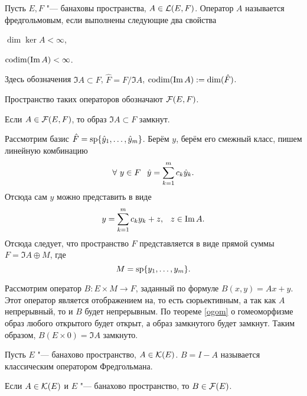 \begin{Def}
  Пусть $E,F$ "--- банаховы пространства, $A\in\L(E,F)$. Оператор $A$ называется фредгольмовым, если выполнены следующие два свойства
\begin{roItems}
\item $\dim\ker A<\infty$,
\item $\codim(\Im A)<\infty$.
\end{roItems}
Здесь обозначения $\Im A\subset F$, $\hat F = F/\Im A$, $\codim (\Im A):=\dim(\hat F)$.

Пространство таких операторов обозначают $\FF(E,F)$.

\end{Def}
\begin{Lem}
Если $A\in\FF(E,F)$, то образ $\Im A\subset F$ замкнут.
\end{Lem}
\begin{Proof}
  Рассмотрим базис $\hat F = \sp\{\hat y_1,\dots,\hat y_m\}$. Берём $y$, берём его смежный класс, пишем линейную комбинацию
\[
  \forall\ y\in F\pau \hat y = \RY k1m c_k\hat y_k.
\]
Отсюда сам $y$ можно представить в виде
\[
  y = \RY k1m c_k y_k + z,\pau z\in \Im A.
\]
Отсюда следует, что пространство $F$ представляется в виде прямой суммы $F = \Im A \oplus M$, где
\[
  M = \sp\{y_1,\dots,y_m\}.
\]

Рассмотрим оператор $B\colon E\times M\to F$, заданный по формуле $B(x,y) = Ax + y$. Этот оператор является отображением на, то есть сюрьективным, а так как $A$ непрерывный, то и $B$ будет непрерывным.
По теореме \ref{ogom} о гомеоморфизме образ любого открытого будет открыт, а образ замкнутого будет замкнут. Таким образом, $B(E\times 0) = \Im A$ замкнуто.
\end{Proof}
\begin{Def}
  Пусть $E$ "--- банахово пространство, $A\in \K(E)$. $B = I-A$ называется классическим оператором Фредгольмана.
\end{Def}
\begin{The}
Если $A\in\K(E)$ и $E$ "--- банахово пространство, то $B\in\FF(E)$.
\end{The}
